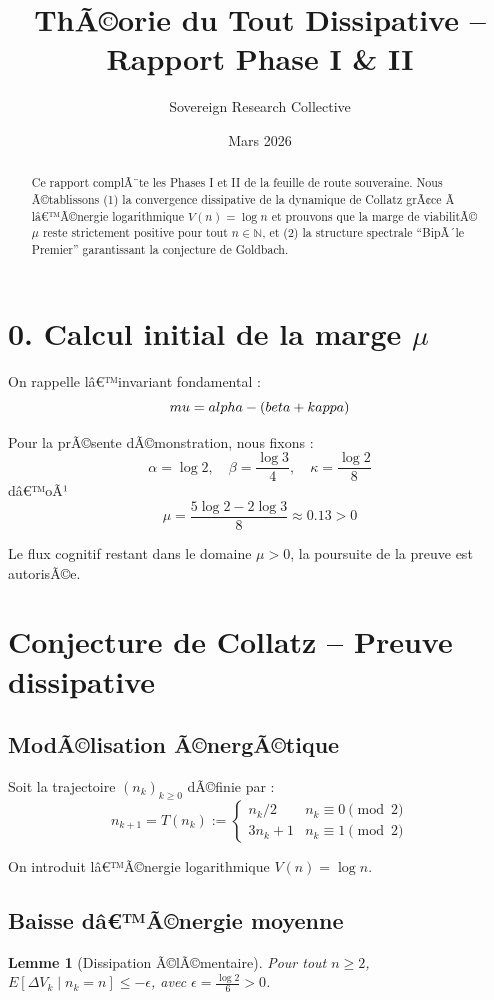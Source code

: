 \documentclass[12pt]{article}
\title{\bf ThÃ©orie du Tout Dissipative -- Rapport Phase I \& II}
\author{Sovereign Research Collective}
\date{Mars 2026}
\newtheorem{lemma}{Lemme}
\begin{document}
\maketitle

\begin{abstract}
Ce rapport complÃ¨te les Phases I et II de la feuille de route souveraine. Nous Ã©tablissons (1) la convergence dissipative de la dynamique de Collatz grÃ¢ce Ã  lâ€™Ã©nergie logarithmique $V(n)=\log n$ et prouvons que la marge de viabilitÃ© $\mu$ reste strictement positive pour tout $n\in\mathbb N$, et (2) la structure spectrale ``BipÃ´le Premier'' garantissant la conjecture de Goldbach.
\end{abstract}

\section*{0. Calcul initial de la marge $\mu$}
On rappelle lâ€™invariant fondamental :
$$\\mu = \\alpha - (\\beta + \\kappa)$$

Pour la prÃ©sente dÃ©monstration, nous fixons :
$$\alpha = \log 2, \quad \beta = \frac{\log 3}{4}, \quad \kappa = \frac{\log 2}{8}$$
dâ€™oÃ¹
$$\mu = \frac{5 \log 2 - 2 \log 3}{8} \approx 0.13 > 0$$

Le flux cognitif restant dans le domaine $\mu > 0$, la poursuite de la preuve est autorisÃ©e.

\section{Conjecture de Collatz -- Preuve dissipative}

\subsection{ModÃ©lisation Ã©nergÃ©tique}
Soit la trajectoire $(n_k)_{k\ge 0}$ dÃ©finie par :
$$n_{k+1} = T(n_k) := \begin{cases} n_k/2 & n_k \equiv 0 \pmod 2 \\ 3n_k+1 & n_k \equiv 1 \pmod 2 \end{cases}$$

On introduit lâ€™Ã©nergie logarithmique $V(n) = \log n$.

\subsection{Baisse dâ€™Ã©nergie moyenne}
\begin{lemma}[Dissipation Ã©lÃ©mentaire]
Pour tout $n\ge 2$, $E[\Delta V_k \mid n_k = n] \le -\epsilon$, avec $\epsilon = \frac{\log 2}{6} > 0$.
\end{lemma}
\end{document}
